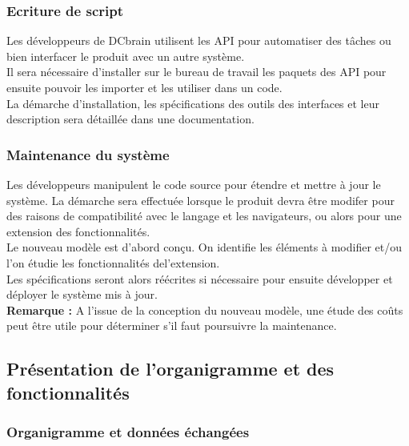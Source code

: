 			\subsubsection{Ecriture de script}
				Les développeurs de DCbrain utilisent les API pour automatiser des tâches ou bien interfacer le produit avec un autre système.\\
				Il sera nécessaire d'installer sur le bureau de travail les paquets des API pour ensuite pouvoir les importer et les utiliser dans un code.\\
				La démarche d'installation, les spécifications des outils des interfaces et leur description sera détaillée dans une documentation.
				
			\subsubsection{Maintenance du système}
				Les développeurs manipulent le code source pour étendre et mettre à jour le système. La démarche sera effectuée lorsque le produit devra être modifer pour des raisons de compatibilité avec le langage et les navigateurs, ou alors pour une extension des fonctionnalités.\\
				Le nouveau modèle est d'abord conçu. On identifie les éléments à modifier et/ou l'on étudie les fonctionnalités del'extension.\\
				Les spécifications seront alors réécrites si nécessaire pour ensuite développer et déployer le système mis à jour.\\
				\textbf{Remarque :} A l'issue de la conception du nouveau modèle, une étude des coûts peut être utile pour déterminer s'il faut poursuivre la maintenance.
				
		\subsection{Présentation de l'organigramme et des fonctionnalités}
		
			\subsubsection{Organigramme et données échangées}
			
